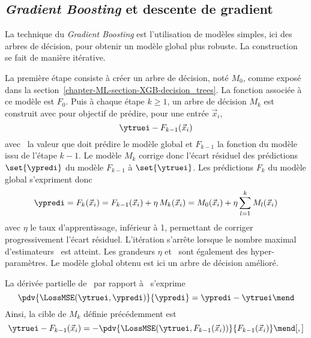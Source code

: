 \subsection{\emph{Gradient Boosting} et descente de gradient}\label{chapter-ML-section-XGB-grad_boost}
La technique du \emph{Gradient Boosting} est
l'utilisation de modèles simples,
ici des arbres de décision,
pour obtenir un modèle global plus robuste.
La construction se fait de manière itérative.
\par
La première étape consiste à créer un arbre de décision, noté $M_0$, comme exposé dans la section~\ref{chapter-ML-section-XGB-decision_trees}.
La fonction associée à ce modèle est $F_0$.
Puis à chaque étape $k\geq1$,
un arbre de décision $M_k$ est construit avec pour objectif de prédire,
pour une entrée $\vec{x}_i$,
\begin{equation}
\ytruei - F_{k-1}(\vec{x}_i)
\end{equation}
avec
\ytruei\ la valeur que doit prédire le modèle global %
et
$F_{k-1}$ la fonction du modèle issu de l'étape ${k-1}$.
Le modèle $M_k$ corrige donc l'écart résiduel des prédictions $\set{\ypredi}$ du modèle $F_{k-1}$ à $\set{\ytruei}$.
Les prédictions $F_k$ du modèle global s'expriment donc
\begin{equation}
\ypredi
=
F_k(\vec{x}_i)
=
F_{k-1}(\vec{x}_i) + \eta\,M_k(\vec{x}_i)
=
M_0(\vec{x}_i) + \eta \sum_{l=1}^{k} M_l(\vec{x}_i)
\end{equation}
avec
$\eta$ le taux d'apprentissage, inférieur à 1, permettant de corriger progressivement l'écart résiduel.
L'itération s'arrête lorsque le nombre maximal d'estimateurs \Nestimators\ est atteint.
Les grandeurs $\eta$ et \Nestimators\ sont également des hyper-paramètres.
Le modèle global obtenu est ici un arbre de décision amélioré.
\par
La dérivée partielle de \LossMSE\
par rapport à \ypredi\
s'exprime
\begin{equation}
\pdv{\LossMSE(\ytruei, \ypredi)}{\ypredi} = \ypredi - \ytruei
\mend
\end{equation}
Ainsi, la cible de $M_k$ définie précédemment est
\begin{equation}
\ytruei - F_{k-1}(\vec{x}_i)
=
- \pdv{\LossMSE(\ytruei, F_{k-1}(\vec{x}_i))}{F_{k-1}(\vec{x}_i)}
\mend[,]
\end{equation}
